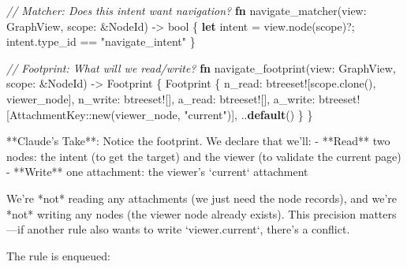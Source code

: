 \documentclass[
  11pt,
]{book}
\newenvironment{Shaded}{}{}
\newcommand{\CommentTok}[1]{\textcolor[rgb]{0.38,0.63,0.69}{\textit{#1}}}
\newcommand{\DataTypeTok}[1]{\textcolor[rgb]{0.56,0.13,0.00}{#1}}
\newcommand{\KeywordTok}[1]{\textcolor[rgb]{0.00,0.44,0.13}{\textbf{#1}}}
\newcommand{\NormalTok}[1]{#1}
\newcommand{\OperatorTok}[1]{\textcolor[rgb]{0.40,0.40,0.40}{#1}}
\newcommand{\PreprocessorTok}[1]{\textcolor[rgb]{0.74,0.48,0.00}{#1}}
\newcommand{\StringTok}[1]{\textcolor[rgb]{0.25,0.44,0.63}{#1}}
\begin{document}
\begin{Shaded}
\begin{Highlighting}[]
\CommentTok{// Matcher: Does this intent want navigation?}
\KeywordTok{fn}\NormalTok{ navigate\_matcher(view}\OperatorTok{:}\NormalTok{ GraphView}\OperatorTok{,}\NormalTok{ scope}\OperatorTok{:} \OperatorTok{\&}\NormalTok{NodeId) }\OperatorTok{{-}\textgreater{}} \DataTypeTok{bool} \OperatorTok{\{}
    \KeywordTok{let}\NormalTok{ intent }\OperatorTok{=}\NormalTok{ view}\OperatorTok{.}\NormalTok{node(scope)}\OperatorTok{?;}
\NormalTok{    intent}\OperatorTok{.}\NormalTok{type\_id }\OperatorTok{==} \StringTok{"navigate\_intent"}
\OperatorTok{\}}

\CommentTok{// Footprint: What will we read/write?}
\KeywordTok{fn}\NormalTok{ navigate\_footprint(view}\OperatorTok{:}\NormalTok{ GraphView}\OperatorTok{,}\NormalTok{ scope}\OperatorTok{:} \OperatorTok{\&}\NormalTok{NodeId) }\OperatorTok{{-}\textgreater{}}\NormalTok{ Footprint }\OperatorTok{\{}
\NormalTok{    Footprint }\OperatorTok{\{}
\NormalTok{        n\_read}\OperatorTok{:} \PreprocessorTok{btreeset!}\NormalTok{[scope}\OperatorTok{.}\NormalTok{clone()}\OperatorTok{,}\NormalTok{ viewer\_node]}\OperatorTok{,}
\NormalTok{        n\_write}\OperatorTok{:} \PreprocessorTok{btreeset!}\NormalTok{[]}\OperatorTok{,}
\NormalTok{        a\_read}\OperatorTok{:} \PreprocessorTok{btreeset!}\NormalTok{[]}\OperatorTok{,}
\NormalTok{        a\_write}\OperatorTok{:} \PreprocessorTok{btreeset!}\NormalTok{[}\PreprocessorTok{AttachmentKey::}\NormalTok{new(viewer\_node}\OperatorTok{,} \StringTok{"current"}\NormalTok{)]}\OperatorTok{,}
        \OperatorTok{..}\KeywordTok{default}\NormalTok{()}
    \OperatorTok{\}}
\OperatorTok{\}}
\end{Highlighting}
\end{Shaded}

\begin{claudecommentary}
**Claude's Take**: Notice the footprint. We declare that we'll:
- **Read** two nodes: the intent (to get the target) and the viewer (to validate the current page)
- **Write** one attachment: the viewer's `current` attachment

We're *not* reading any attachments (we just need the node records), and we're *not* writing any nodes (the viewer node already exists). This precision matters—if another rule also wants to write `viewer.current`, there's a conflict.
\end{claudecommentary}

The rule is enqueued:
\end{document}
